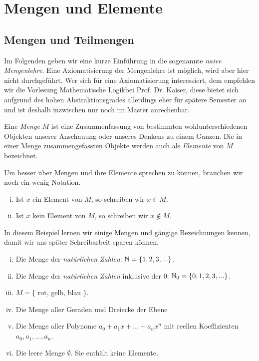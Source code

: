 \chapter{Mengen und Elemente}

\section{Mengen und Teilmengen}
Im Folgenden geben wir eine kurze Einführung in die sogenannte \textit{naive Mengenlehre}. Eine Axiomatisierung der Mengenlehre ist möglich, wird aber hier nicht durchgeführt. 
Wer sich für eine Axiomatisierung interessiert, dem empfehlen wir die Vorlesung \glqq Mathematische Logik\grqq bei Prof. Dr. Kaiser, diese bietet sich aufgrund des hohen Abstraktionsgrades allerdings eher für spätere Semester an und ist deshalb inzwischen nur noch im Master anrechenbar. 

\begin{mydef}
    Eine \textit{Menge} $M$ ist eine Zusammenfassung von bestimmten wohlunterschiedenen Objekten unserer Anschauung oder unseres Denkens zu einem Ganzen. 
    Die in einer Menge zusammengefassten Objekte werden auch als \textit{Elemente} von $M$ bezeichnet. 
\end{mydef}

\begin{remark}
    Um besser über Mengen und ihre Elemente sprechen zu können, brauchen wir noch ein wenig Notation. 
    \begin{enumerate}[(i)]
        \item 
        Ist $x$ ein Element von $M$, so schreiben wir $x \in M$. 
        \item 
        Ist $x$ kein Element von $M$, so schreiben wir $x \notin M$. 
    \end{enumerate}
\end{remark}

\begin{example}
    In diesem Beispiel lernen wir einige Mengen und gängige Bezeichnungen kennen, damit wir uns später Schreibarbeit sparen können. 
    \begin{enumerate}[(i)]
        \item 
        Die Menge der \textit{natürlichen Zahlen}: $\mathbb{N} = \{1,2,3,...\}$.
        \item 
        Die Menge der \textit{natürlichen Zahlen} inklusive der $0$: $\mathbb{N}_0 = \{0,1,2,3,...\}$. 
        \item 
        $M = \{$ rot, gelb, blau $\}$. 
        \item 
        Die Menge aller Geraden und Dreiecke der Ebene
        \item 
        Die Menge aller Polynome $a_0 + a_1 x + ... + a_n x^n$ mit reellen Koeffizienten $a_0,a_1,...,a_n$. 
        \item 
        Die leere Menge $\emptyset$. Sie enthält keine Elemente. 
    \end{enumerate}
\end{example}

